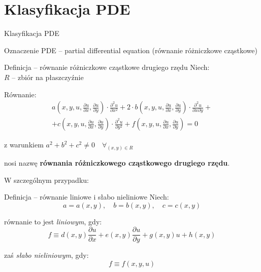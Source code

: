 \section{Klasyfikacja PDE}

\begin{frame}{Klasyfikacja PDE}
  \begin{block}{Oznaczenie}
    PDE -- partial differential equation (równanie różniczkowe cząstkowe)
  \end{block}
\end{frame}

\begin{frame}
  \begin{block}{Definicja -- równanie różniczkowe cząstkowe drugiego rzędu}
    Niech:\\
    $R$ -- zbiór na płaszczyźnie

    Równanie:
\begin{equation}\label{1}
\begin{split}      
a(x, y, u, \frac{{\partial}u}{{\partial}x}, \frac{{\partial}u}{{\partial}y}) \cdot \frac{{\partial}^2u}{{\partial}x^2} +
      2 \cdot b(x, y, u, \frac{{\partial}u}{{\partial}x}, \frac{{\partial}u}{{\partial}y}) \cdot \frac{{\partial}^2u}{{\partial}x{\partial}y} + \\
      + c(x, y, u, \frac{{\partial}u}{{\partial}x}, \frac{{\partial}u}{{\partial}y}) \cdot \frac{{\partial}^2u}{{\partial}y^2} +
      f(x, y, u, \frac{{\partial}u}{{\partial}x}, \frac{{\partial}u}{{\partial}y}) = 0 
\end{split}
\end{equation}


    z warunkiem $a^2 + b^2 + c^2 \not = 0 \quad \forall_{(x,y) \in R}$

    nosi nazwę \textbf{równania różniczkowego cząstkowego drugiego rzędu}.
  \end{block}
\end{frame}

\begin{frame}
  W szczególnym przypadku:

  \begin{block}{Definicja -- równanie liniowe i słabo nieliniowe}
    Niech:
    $$a = a(x,y), \quad b = b(x,y), \quad c = c(x,y)$$

    równanie to jest \textit{liniowym}, gdy:
    $$f \equiv d(x,y) \frac{{\partial}u}{{\partial}x} + e(x,y) \frac{{\partial}u}{{\partial}y} + g(x,y)u + h(x,y)$$

    zaś \textit{słabo nieliniowym}, gdy:
    $$f \equiv f(x,y,u)$$
  \end{block}
\end{frame}

